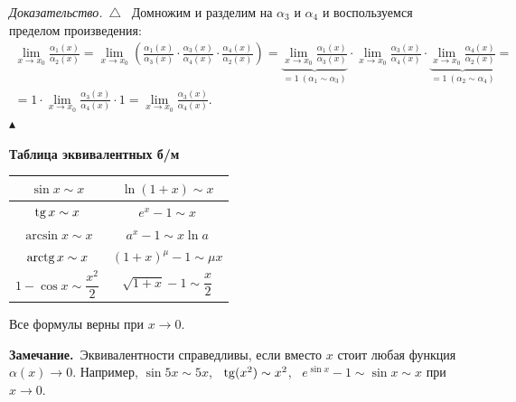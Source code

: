 \documentclass[a4paper,11pt]{article}
\newcommand{\zam}{\par\smallskip\noindent\textbf{\textcolor{zamc}{Замечание.}}\ }
\newenvironment{dok}
  {\par\smallskip\noindent\textit{Доказательство.}\ $\triangle$\ \ignorespaces}
  {\unskip\nobreak\hfill$\blacktriangle$\par\smallskip}
\newcommand{\podr}[1]{\par\needspace{8\baselineskip}\medskip
  {\large\bfseries\textcolor{oprc!80!black}{#1}}\par\nopagebreak\smallskip}
\begin{document}
\begin{dok}
Домножим и разделим на $\alpha_3$ и $\alpha_4$ и воспользуемся пределом произведения:
\begin{multline*}
  \lim_{x \to x_0} \frac{\alpha_1(x)}{\alpha_2(x)}
  = \lim_{x \to x_0} \left(\frac{\alpha_1(x)}{\alpha_3(x)} \cdot \frac{\alpha_3(x)}{\alpha_4(x)} \cdot \frac{\alpha_4(x)}{\alpha_2(x)}\right)
  = \underbrace{\lim_{x \to x_0} \frac{\alpha_1(x)}{\alpha_3(x)}}_{=1\ (\alpha_1 \sim \alpha_3)} \cdot
    \lim_{x \to x_0} \frac{\alpha_3(x)}{\alpha_4(x)} \cdot
    \underbrace{\lim_{x \to x_0} \frac{\alpha_4(x)}{\alpha_2(x)}}_{=1\ (\alpha_2 \sim \alpha_4)} = \\
  = 1 \cdot \lim_{x \to x_0} \frac{\alpha_3(x)}{\alpha_4(x)} \cdot 1
  = \lim_{x \to x_0} \frac{\alpha_3(x)}{\alpha_4(x)}.
\end{multline*}
\end{dok}

\podr{Таблица эквивалентных б/м}

\begin{center}
\renewcommand{\arraystretch}{1.7}
\begin{tabular}{|c|c|}
  \hline
  $\sin x \sim x$ & $\ln(1 + x) \sim x$ \\ \hline
  $\operatorname{tg} x \sim x$ & $e^x - 1 \sim x$ \\ \hline
  $\arcsin x \sim x$ & $a^x - 1 \sim x \ln a$ \\ \hline
  $\operatorname{arctg} x \sim x$ & $(1 + x)^\mu - 1 \sim \mu x$ \\ \hline
  $1 - \cos x \sim \dfrac{x^2}{2}$ & $\sqrt{1 + x} - 1 \sim \dfrac{x}{2}$ \\ \hline
\end{tabular}
\end{center}
Все формулы верны при \textbf{$x \to 0$}.

\zam Эквивалентности справедливы, если вместо $x$ стоит любая функция $\alpha(x) \to 0$. Например,
$\sin 5x \sim 5x$, \ $\operatorname{tg}(x^2) \sim x^2$, \ $e^{\sin x} - 1 \sim \sin x \sim x$ при $x \to 0$.
\end{document}
